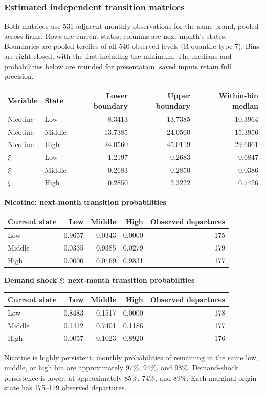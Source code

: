 \documentclass[10pt,]{article}
\begin{document}
\subsubsection{Estimated independent transition
matrices}\label{estimated-independent-transition-matrices}

Both matrices use 531 adjacent monthly observations for the same brand,
pooled across firms. Rows are current states; columns are next month's
states. Boundaries are pooled terciles of all 540 observed levels (R
quantile type 7). Bins are right-closed, with the first including the
minimum. The medians and probabilities below are rounded for
presentation; saved inputs retain full precision.

\begin{longtable}[]{@{}llrrr@{}}
\toprule
Variable & State & Lower boundary & Upper boundary & Within-bin
median\tabularnewline
\midrule
\endhead
Nicotine & Low & 8.3413 & 13.7385 & 10.3964\tabularnewline
Nicotine & Middle & 13.7385 & 24.0560 & 15.3956\tabularnewline
Nicotine & High & 24.0560 & 45.0119 & 29.6061\tabularnewline
\(\xi\) & Low & -1.2197 & -0.2683 & -0.6847\tabularnewline
\(\xi\) & Middle & -0.2683 & 0.2850 & -0.0386\tabularnewline
\(\xi\) & High & 0.2850 & 2.3222 & 0.7426\tabularnewline
\bottomrule
\end{longtable}

\textbf{Nicotine: next-month transition probabilities}

\begin{longtable}[]{@{}lrrrr@{}}
\toprule
Current state & Low & Middle & High & Observed departures\tabularnewline
\midrule
\endhead
Low & 0.9657 & 0.0343 & 0.0000 & 175\tabularnewline
Middle & 0.0335 & 0.9385 & 0.0279 & 179\tabularnewline
High & 0.0000 & 0.0169 & 0.9831 & 177\tabularnewline
\bottomrule
\end{longtable}

\textbf{Demand shock \(\xi\): next-month transition probabilities}

\begin{longtable}[]{@{}lrrrr@{}}
\toprule
Current state & Low & Middle & High & Observed departures\tabularnewline
\midrule
\endhead
Low & 0.8483 & 0.1517 & 0.0000 & 178\tabularnewline
Middle & 0.1412 & 0.7401 & 0.1186 & 177\tabularnewline
High & 0.0057 & 0.1023 & 0.8920 & 176\tabularnewline
\bottomrule
\end{longtable}

Nicotine is highly persistent: monthly probabilities of remaining in the
same low, middle, or high bin are approximately 97\%, 94\%, and 98\%.
Demand-shock persistence is lower, at approximately 85\%, 74\%, and
89\%. Each marginal origin state has 175--179 observed departures.
\end{document}
